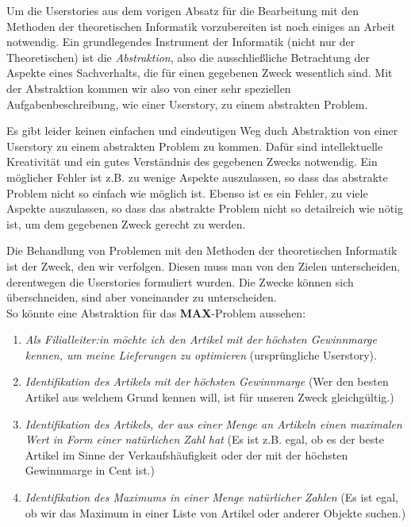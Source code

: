 Um die Userstories aus dem vorigen Absatz für die Bearbeitung mit den Methoden der
theoretischen Informatik vorzubereiten ist noch einiges an Arbeit notwendig.
Ein grundlegendes Instrument der Informatik (nicht nur der Theoretischen) 
ist die \emph{Abstraktion}, also die ausschließliche Betrachtung der Aspekte eines Sachverhalts,
die für einen gegebenen Zweck wesentlich sind.
Mit der Abstraktion kommen wir also von einer sehr speziellen Aufgabenbeschreibung,
wie einer Userstory, zu einem abstrakten Problem.

Es gibt leider keinen einfachen und eindeutigen Weg
duch Abstraktion von einer Userstory zu einem abstrakten Problem zu kommen.
Dafür sind intellektuelle Kreativität und ein gutes Verständnis des gegebenen Zwecks notwendig.
Ein möglicher Fehler ist z.B. zu wenige Aspekte auszulassen,
so dass das abstrakte Problem nicht so einfach wie möglich ist. 
Ebenso ist es ein Fehler, zu viele Aspekte auszulassen,
so dass das abstrakte Problem nicht so detailreich wie nötig ist,
um dem gegebenen Zweck gerecht zu werden.

Die Behandlung von Problemen mit den Methoden der theoretischen Informatik
ist der Zweck, den wir verfolgen. 
Diesen muss man von den Zielen unterscheiden,
derentwegen die Userstories formuliert wurden.
Die Zwecke können sich überschneiden, sind aber voneinander zu unterscheiden.\\

\noindent
So könnte eine Abstraktion für das \textbf{MAX}-Problem aussehen:
\begin{enumerate}
    \item \emph{Als Filialleiter:in möchte ich den Artikel mit der höchsten Gewinnmarge kennen,
        um meine Lieferungen zu optimieren} (ursprüngliche Userstory).
    \item \emph{Identifikation des Artikels mit der höchsten Gewinnmarge}
        (Wer den besten Artikel aus welchem Grund kennen will,
        ist für unseren Zweck gleichgültig.)
    \item \emph{Identifikation des Artikels,
        der aus einer Menge an Artikeln einen maximalen Wert in Form einer natürlichen Zahl hat}
        (Es ist z.B. egal,
        ob es der beste Artikel im Sinne der Verkaufshäufigkeit
        oder der mit der höchsten Gewinnmarge in Cent ist.)
    \item \emph{Identifikation des Maximums in einer Menge natürlicher Zahlen}
        (Es ist egal, ob wir das Maximum in einer Liste von Artikel oder anderer Objekte suchen.)
\end{enumerate}

